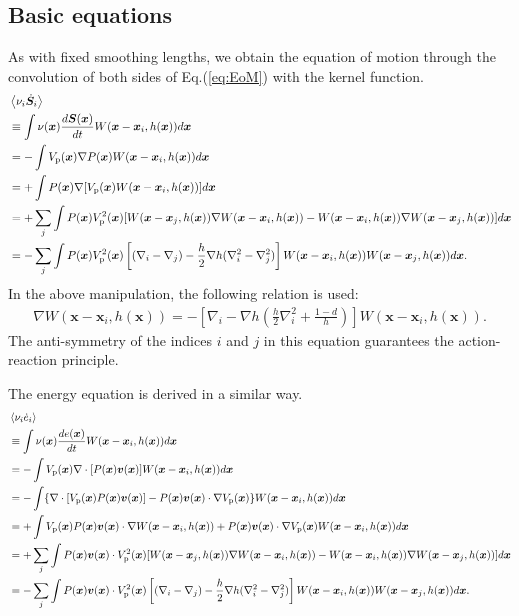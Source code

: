 \documentclass[]{aastex631}
\begin{document}
\subsection{Basic equations}
As with fixed smoothing lengths,
we obtain the equation of motion through the convolution of both sides of Eq.(\ref{eq:EoM}) with the kernel function.
\begin{align}
  &\ev{\nu_i\dot{\bm{S}}_i}\\
  &\equiv  \int \nu(\bm{x}) \frac{d\bm{S}(\bm{x})}{dt}W(\bm{x}-\bm{x}_i,h(\bm{x}))d\bm{x}\\
  &=-\int V_{\rm p}(\bm{x})\nabla P(\bm{x}) W(\bm{x}-\bm{x}_i,h(\bm{x}))d\bm{x}\\
  &=+\int P(\bm{x})\nabla [V_{\rm p}(\bm{x}) W(\bm{x}-\bm{x}_i,h(\bm{x}))] d\bm{x}\\
  &=+\sum_j\int P(\bm{x})V_{\rm p}^2(\bm{x})[W(\bm{x}-\bm{x}_j,h(\bm{x}))\nabla W(\bm{x}-\bm{x}_i,h(\bm{x}))-W(\bm{x}-\bm{x}_i,h(\bm{x}))\nabla W(\bm{x}-\bm{x}_j,h(\bm{x}))] d\bm{x}\\
  &=-\sum_j\int P(\bm{x})V_{\rm p}^2(\bm{x}) \left[ (\nabla_i-\nabla_j)-\frac{h}{2}\nabla h (\nabla_i^2 -\nabla_j^2) \right] W(\bm{x}-\bm{x}_i,h(\bm{x}))W(\bm{x}-\bm{x}_j,h(\bm{x}))d\bm{x}.
\end{align}
In the above manipulation, the following relation is used:
\begin{align}
    \nabla W(\bm{x}-\bm{x}_i,h(\bm{x})) = -\left[ \nabla_i - \nabla h\left( \frac{h}{2} \nabla_i^2 + \frac{1-d}{h}\right)\right] W(\bm{x}-\bm{x}_i,h(\bm{x})).
\end{align}
The anti-symmetry of the indices $i$ and $j$ in this equation guarantees the action-reaction principle.

The energy equation is derived in a similar way.
\begin{align}
  &\ev{\nu_i\dot{e}_i}\\
  &\equiv  \int \nu(\bm{x}) \frac{de(\bm{x})}{dt}W(\bm{x}-\bm{x}_i,h(\bm{x}))d\bm{x}\\
  &=-\int V_{\rm p}(\bm{x})\nabla \cdot [P(\bm{x})\bm{v}(\bm{x})] W(\bm{x}-\bm{x}_i,h(\bm{x}))d\bm{x}\\
  &=-\int \{ \nabla\cdot [V_{\rm p}(\bm{x}) P(\bm{x})\bm{v}(\bm{x}) ] - P(\bm{x})\bm{v}(\bm{x})\cdot\nabla V_{\rm p}(\bm{x})\}  W(\bm{x}-\bm{x}_i,h(\bm{x}))d\bm{x}\\
  &=+\int  V_{\rm p}(\bm{x}) P(\bm{x})\bm{v}(\bm{x}) \cdot\nabla W(\bm{x}-\bm{x}_i,h(\bm{x})) + P(\bm{x})\bm{v}(\bm{x})\cdot\nabla V_{\rm p}(\bm{x})  W(\bm{x}-\bm{x}_i,h(\bm{x}))d\bm{x}\\
  &=+\sum_j\int P(\bm{x})\bm{v}(\bm{x})\cdot V_{\rm p}^2(\bm{x})[W(\bm{x}-\bm{x}_j,h(\bm{x}))\nabla W(\bm{x}-\bm{x}_i,h(\bm{x}))-W(\bm{x}-\bm{x}_i,h(\bm{x}))\nabla W(\bm{x}-\bm{x}_j,h(\bm{x}))] d\bm{x}\\
  &=-\sum_j\int P(\bm{x})\bm{v}(\bm{x})\cdot V_{\rm p}^2(\bm{x}) \left[ (\nabla_i-\nabla_j)-\frac{h}{2}\nabla h (\nabla_i^2 -\nabla_j^2) \right] W(\bm{x}-\bm{x}_i,h(\bm{x}))W(\bm{x}-\bm{x}_j,h(\bm{x}))d\bm{x}.
\end{align}
\end{document}
